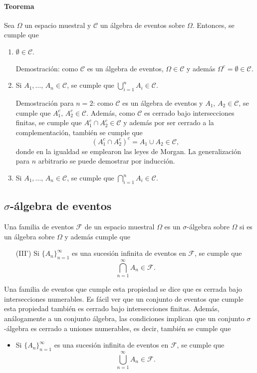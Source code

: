 \documentclass[a4paper]{report}
\begin{document}
\paragraph{Teorema} Sea \(\Omega\) un espacio muestral y \(\mathcal{C}\) un álgebra de eventos sobre \(\Omega\). Entonces, se cumple que
\begin{enumerate}
 \item \(\emptyset\in\mathcal{C}\).
 
 Demostración: como \(\mathcal{C}\) es un álgebra de eventos, \(\Omega\in\mathcal{C}\) y además \(\Omega^c=\emptyset\in\mathcal{C}\).
 \item Si \(A_1,\dots,\,A_n\in\mathcal{C}\), se cumple que \(\bigcup_{i=1}^nA_i\in\mathcal{C}\).
 
 Demostración para \(n=2\): como \(\mathcal{C}\) es un álgebra de eventos y \(A_1,\,A_2\in\mathcal{C}\), se cumple que \(A_1^c,\,A_2^c\in\mathcal{C}\). Además, como \(\mathcal{C}\) es cerrado bajo intersecciones finitas, se cumple que \(A_1^c\cap A_2^c\in\mathcal{C}\) y además por ser cerrado a la complementación, también se cumple que
 \[
  \left(A_1^c\cap A_2^c\right)^c=A_1\cup A_2\in\mathcal{C},
 \]
donde en la igualdad se emplearon las leyes de Morgan. La generalización para \(n\) arbitrario se puede demostrar por inducción.
\item Si \(A_1,\dots,\,A_n\in\mathcal{C}\), se cumple que \(\bigcap_{i=1}^nA_i\in\mathcal{C}\).
\end{enumerate}

\subsection{\texorpdfstring{\(\sigma\)}{}-álgebra de eventos}

Una familia de eventos \(\mathcal{F}\) de un espacio muestral \(\Omega\) es un \(\sigma\)-álgebra sobre \(\Omega\) si es un álgebra sobre \(\Omega\) y además cumple que 
\begin{itemize}
 \item[(III')] Si \(\{A_n\}_{n=1}^{\infty}\) es una sucesión infinita de eventos en \(\mathcal{F}\), se cumple que
 \[
  \bigcap_{n=1}^{\infty}A_n\in\mathcal{F}.
 \]
\end{itemize}
Una familia de eventos que cumple esta propiedad se dice que es cerrada bajo intersecciones numerables. Es fácil ver que un conjunto de eventos que cumple esta propiedad también es cerrado bajo intersecciones finitas. Además, análogamente a un conjunto álgebra, las condiciones implican que un conjunto \(\sigma\)-álgebra es cerrado a uniones numerables, es decir, también se cumple que
\begin{itemize}
 \item Si \(\{A_n\}_{n=1}^{\infty}\) es una sucesión infinita de eventos en \(\mathcal{F}\), se cumple que
 \[
  \bigcup_{n=1}^{\infty}A_n\in\mathcal{F}.
 \]
\end{itemize}
\end{document}
